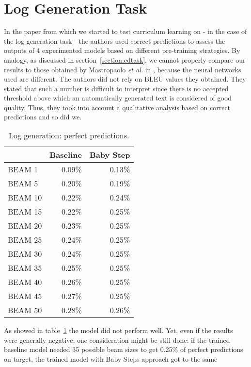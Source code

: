 \section{Log Generation Task}
In the paper from which we started to test curriculum learning on - in the case of the log generation task - the authors used
correct predictions to assess the outputs of 4 experimented models based on different pre-training strategies. 
By analogy, as discussed in section~\ref{section:cdtask}, we cannot properly compare our results to those 
obtained by Mastropaolo \textit{et al.} in \cite{Mastropaolo2022}, because the neural networks used are different.
The authors did not rely on BLEU values they obtained. They stated that such a number is difficult to 
interpret since there is no accepted threshold above which an automatically generated text is considered of 
good quality. Thus, they took into account a qualitative analysis based on correct predictions and so did we.
\begin{table}[h!]
    \centering
    \begin{tabular}{l|r|r} 
    & Baseline & Baby Step\\ [0.5ex] 
    \hline
    BEAM 1 & 0.09\% &  0.13\%\\  
    BEAM 5 &  0.20\% &  0.19\% \\ 
    BEAM 10 &  0.22\% &  0.24\%\\
    BEAM 15 &  0.22\% &  0.25\%\\
    BEAM 20 &  0.23\% &  0.25\%\\
    BEAM 25 &  0.24\% &  0.25\%\\
    BEAM 30 &  0.24\% &  0.25\%\\
    BEAM 35 &  0.25\% &  0.25\%\\
    BEAM 40 &  0.26\% &  0.25\%\\
    BEAM 45 &  0.27\% & 0.25\%\\
    BEAM 50 &  0.28\% & 0.26\%\\ [1ex]
    \end{tabular}
    \caption{Log generation: perfect predictions.}
    \label{table:3}
\end{table}
As showed in table~\ref{table:3} the model did not perform well. 
Yet, even if the results were generally negative, one consideration might be still done:
if the trained baseline model needed 35 possible
beam sizes to get 0.25\% of perfect predictions on target, the trained model with Baby Steps approach got to the same 

